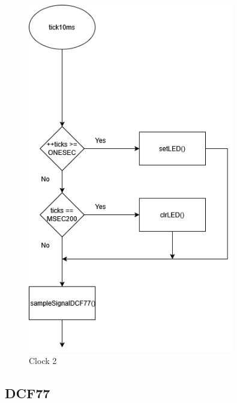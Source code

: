 \documentclass[a4paper,12pt]{article}
\begin{document}
\begin{figure}[H]
    \centering
    \includegraphics[width=0.8\textwidth]{diagrams/4.clock2.png}
    \caption{Clock 2}
    \label{fig:Clock2}
\end{figure}


\subsection{DCF77}
\end{document}

